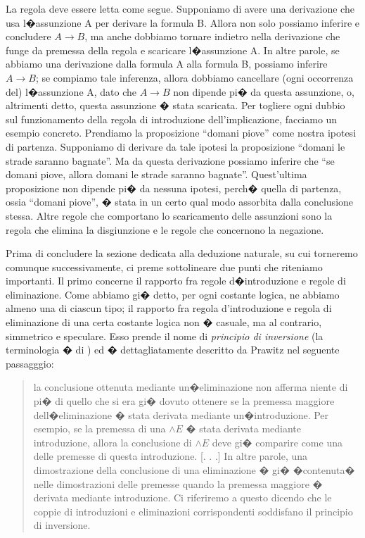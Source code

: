 \documentclass[a4paper,12pt]{aphex}
\begin{document}
\noindent La regola deve essere letta come segue. Supponiamo di avere una derivazione che usa l�assunzione A per derivare la formula B. Allora non solo possiamo inferire e concludere $A\rightarrow B$, ma anche dobbiamo tornare indietro nella derivazione che funge da premessa della regola e scaricare l�assunzione A. In altre parole, se abbiamo una derivazione dalla formula A alla formula B, possiamo inferire $A\rightarrow B$; se compiamo tale inferenza, allora dobbiamo cancellare (ogni occorrenza del) l�assunzione A, dato che  $A\rightarrow B$ non dipende pi� da questa assunzione, o, altrimenti detto, questa assunzione � stata scaricata. Per togliere ogni dubbio sul funzionamento della regola di introduzione dell'implicazione, facciamo un esempio concreto. Prendiamo la proposizione  ``domani piove'' come nostra ipotesi di partenza. Supponiamo di derivare da tale ipotesi la proposizione  ``domani le strade saranno bagnate''. Ma da questa derivazione possiamo inferire che  ``se domani piove, allora domani le strade saranno bagnate''. Quest'ultima proposizione non dipende pi� da nessuna ipotesi, perch� quella di partenza, ossia  ``domani piove'', � stata in un certo qual modo assorbita dalla conclusione stessa.  Altre regole che comportano lo scaricamento delle assunzioni sono la regola che elimina la disgiunzione e le regole che concernono la negazione.

Prima di concludere la sezione dedicata alla deduzione naturale, su cui torneremo comunque successivamente, ci preme sottolineare due punti che riteniamo importanti.
Il primo concerne il rapporto fra regole d�introduzione e regole di eliminazione. Come abbiamo gi� detto, per ogni costante logica, ne abbiamo almeno una di ciascun tipo; il rapporto fra regola d'introduzione e regola di eliminazione di una certa costante logica non � casuale, ma al contrario,  simmetrico e speculare. Esso prende il nome di \emph{principio di inversione} (la terminologia � di \cite{Lorenzen}) ed � dettagliatamente descritto da Prawitz nel seguente passagggio: 

\begin{quotation}
la conclusione ottenuta mediante un�eliminazione non afferma niente di pi� di quello che si era gi� dovuto ottenere se la premessa maggiore dell�eliminazione � stata derivata mediante un�introduzione. Per esempio, se la premessa di una $\wedge E$ � stata derivata mediante introduzione, allora la conclusione di $\wedge E$ deve gi� comparire come una delle premesse di questa introduzione.  [. . .] In altre parole, una dimostrazione della conclusione di una eliminazione � gi� �contenuta� nelle dimostrazioni delle premesse quando la premessa maggiore � derivata mediante introduzione. Ci riferiremo a questo dicendo che le coppie
di introduzioni e eliminazioni corrispondenti soddisfano il principio di inversione. \cite[p. 247-248]{Prawitz}
\end{quotation}
\end{document}

